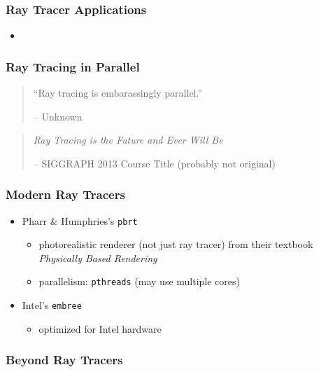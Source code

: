 \documentclass{beamer}
\begin{document}
\begin{frame}
  \frametitle{Ray Tracer Applications}

  \begin{itemize}
  \item 
  \end{itemize}
\end{frame}


\begin{frame}
  \frametitle{Ray Tracing in Parallel}

  \begin{quote}
    ``Ray tracing is embarassingly parallel.''
    \begin{flushright}
      -- Unknown
    \end{flushright}
  \end{quote}
  \begin{quote}
    \textit{Ray Tracing is the Future and Ever Will Be}
    \begin{flushright}
      -- SIGGRAPH 2013 Course Title (probably not original)
    \end{flushright}
  \end{quote}
\end{frame}


\begin{frame}
  \frametitle{Modern Ray Tracers}

  \begin{itemize}

  \item Pharr \& Humphries's \texttt{pbrt}
    \begin{itemize}
    \item photorealistic renderer (not just ray tracer) from their
      textbook \textit{Physically Based Rendering}
    \item parallelism: \texttt{pthreads} (may use multiple cores)
    \end{itemize}

  \item Intel's \texttt{embree}
    \begin{itemize}
    \item optimized for Intel hardware
    \end{itemize}
    

  \end{itemize}
\end{frame}


\begin{frame}
  \frametitle{Beyond Ray Tracers}

\end{frame}
\end{document}
